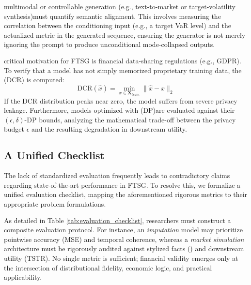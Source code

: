 multimodal or controllable generation (e.g., text-to-market or target-volatility synthesis)must quantify semantic alignment. This involves measuring the correlation between the conditioning input (e.g., a target VaR level) and the actualized metric in the generated sequence, ensuring the generator is not merely ignoring the prompt to produce unconditional mode-collapsed outputs.

critical motivation for FTSG is financial data-sharing regulations (e.g., GDPR). To verify that a model has not simply memorized proprietary training data, the (DCR) is computed:
    \begin{equation}
        \text{DCR}(\hat{x}) = \min_{x \in \mathbf{X}_{train}} \|\hat{x} - x\|_2
    \end{equation}
If the DCR distribution peaks near zero, the model suffers from severe privacy leakage. Furthermore, models optimized with (DP)are evaluated against their $(\epsilon, \delta)$-DP bounds, analyzing the mathematical trade-off between the privacy budget $\epsilon$ and the resulting degradation in downstream utility.

\subsection{A Unified Checklist}
The lack of standardized evaluation frequently leads to contradictory claims regarding state-of-the-art performance in FTSG. To resolve this, we formalize a unified evaluation checklist, mapping the aforementioned rigorous metrics to their appropriate problem formulations.

As detailed in Table \ref{tab:evaluation_checklist}, researchers must construct a composite evaluation protocol. For instance, an \textit{imputation} model may prioritize pointwise accuracy (MSE) and temporal coherence, whereas a \textit{market simulation} architecture must be rigorously audited against stylized facts () and downstream utility (TSTR). No single metric is sufficient; financial validity emerges only at the intersection of distributional fidelity, economic logic, and practical applicability.

